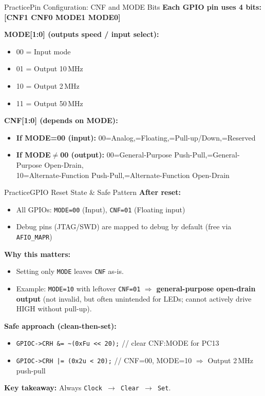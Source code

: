 \documentclass{beamer}
\begin{document}
\begin{frame}{Practice}{Pin Configuration: CNF and MODE Bits}
	\textbf{Each GPIO pin uses 4 bits: [CNF1 CNF0 MODE1 MODE0]}
	\medskip
	
	\textbf{MODE[1:0] (outputs speed / input select):}
	\begin{itemize}
		\item 00 = Input mode
		\item 01 = Output 10\,MHz
		\item 10 = Output 2\,MHz
		\item 11 = Output 50\,MHz
	\end{itemize}
	
	\textbf{CNF[1:0] (depends on MODE):}
	\begin{itemize}
		\item \textbf{If MODE=00 (input):} 00=Analog,=Floating,=Pull-up/Down,=Reserved
		\item \textbf{If MODE$\neq$00 (output):} 00=General-Purpose Push-Pull,=General-Purpose Open-Drain,\\
		10=Alternate-Function Push-Pull,=Alternate-Function Open-Drain
	\end{itemize}
\end{frame}
\begin{frame}{Practice}{GPIO Reset State \& Safe Pattern}
	\textbf{After reset:}
	\begin{itemize}
		\item All GPIOs: \texttt{MODE=00} (Input), \texttt{CNF=01} (Floating input)
		\item Debug pins (JTAG/SWD) are mapped to debug by default (free via \texttt{AFIO\_MAPR})
	\end{itemize}
	
	\textbf{Why this matters:}
	\begin{itemize}
		\item Setting only \texttt{MODE} leaves \texttt{CNF} as-is.
		\item Example: \texttt{MODE=10} with leftover \texttt{CNF=01} $\Rightarrow$ \textbf{general-purpose open-drain output}
		(not invalid, but often unintended for LEDs; cannot actively drive HIGH without pull-up).
	\end{itemize}
	
	\textbf{Safe approach (clean-then-set):}
	\begin{itemize}
		\item \texttt{GPIOC->CRH \&= \textasciitilde(0xFu << 20);} \quad // clear CNF:MODE for PC13
		\item \texttt{GPIOC->CRH |=  (0x2u < 20);} \quad // CNF=00, MODE=10 $\Rightarrow$ Output 2\,MHz push-pull
	\end{itemize}
	
	\textbf{Key takeaway:} Always \texttt{Clock $\rightarrow$ Clear $\rightarrow$ Set}.
\end{frame}
\end{document}

